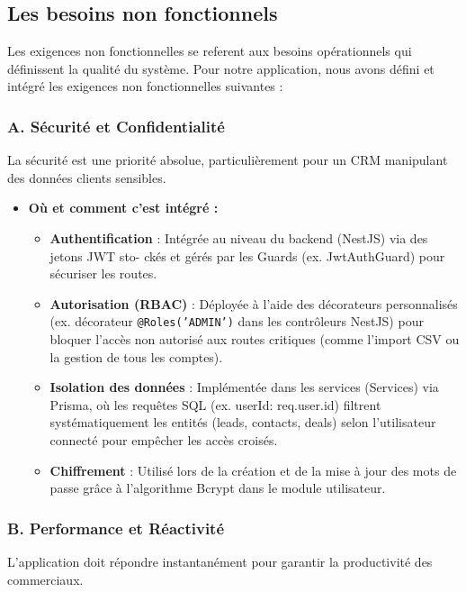 \subsection{Les besoins non fonctionnels}

Les exigences non fonctionnelles se referent aux besoins opérationnels qui définissent la
qualité du système. Pour notre application, nous avons défini et intégré les exigences non
fonctionnelles suivantes :

\subsubsection{A. Sécurité et Confidentialité}

La sécurité est une priorité absolue, particulièrement pour un CRM manipulant des données clients sensibles.

\begin{itemize}
    \item \textbf{Où et comment c’est intégré :}
    \begin{itemize}
        \item \textbf{Authentification} : Intégrée au niveau du backend (NestJS) via des jetons JWT sto-
        ckés et gérés par les Guards (ex. JwtAuthGuard) pour sécuriser les routes.
        \item \textbf{Autorisation (RBAC)} : Déployée à l’aide des décorateurs personnalisés (ex. décorateur \texttt{@Roles('ADMIN')} dans les contrôleurs NestJS) pour bloquer l’accès non autorisé aux routes critiques (comme l’import CSV ou la gestion de tous les comptes).
        \item \textbf{Isolation des données} : Implémentée dans les services (Services) via Prisma, où les requêtes SQL (ex. userId: req.user.id) filtrent systématiquement les entités (leads, contacts, deals) selon l’utilisateur connecté pour empêcher les accès croisés.
        \item \textbf{Chiffrement} : Utilisé lors de la création et de la mise à jour des mots de passe grâce à l’algorithme Bcrypt dans le module utilisateur.
    \end{itemize}
\end{itemize}

\subsubsection{B. Performance et Réactivité}

L’application doit répondre instantanément pour garantir la productivité des commerciaux.


